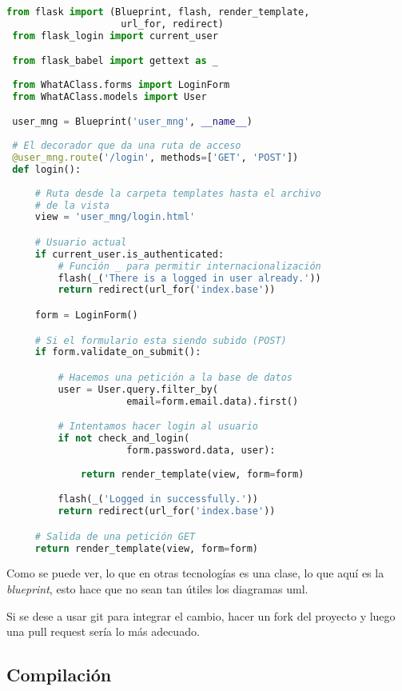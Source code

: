 \lstset{style=blockstyle}
\begin{lstlisting}[language=Python]
 from flask import (Blueprint, flash, render_template, 
                    url_for, redirect)
 from flask_login import current_user

 from flask_babel import gettext as _
 
 from WhatAClass.forms import LoginForm 
 from WhatAClass.models import User

 user_mng = Blueprint('user_mng', __name__)
 
 # El decorador que da una ruta de acceso
 @user_mng.route('/login', methods=['GET', 'POST'])
 def login():
 
     # Ruta desde la carpeta templates hasta el archivo
     # de la vista     
     view = 'user_mng/login.html'

     # Usuario actual
     if current_user.is_authenticated:
         # Función _ para permitir internacionalización
         flash(_('There is a logged in user already.'))
         return redirect(url_for('index.base'))

     form = LoginForm()

     # Si el formulario esta siendo subido (POST)
     if form.validate_on_submit():

         # Hacemos una petición a la base de datos
         user = User.query.filter_by(
                     email=form.email.data).first()

         # Intentamos hacer login al usuario
         if not check_and_login(
                     form.password.data, user):
                     
             return render_template(view, form=form)

         flash(_('Logged in successfully.'))
         return redirect(url_for('index.base'))

     # Salida de una petición GET
     return render_template(view, form=form)
\end{lstlisting}

Como se puede ver, lo que en otras tecnologías es una clase, lo que aquí es la \emph{blueprint}, esto hace que no sean tan útiles los diagramas uml.

Si se dese a usar git para integrar el cambio, hacer un fork del proyecto y luego una pull request sería lo más adecuado. 


\subsection{Compilación}

